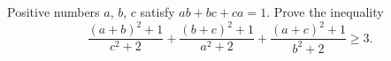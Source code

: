 \problem
Positive numbers $a$, $b$, $c$ satisfy $a b + b c + c a = 1$.
Prove the inequality
\[
    \frac{(a + b)^2 + 1}{c^2 + 2}
    +
    \frac{(b + c)^2 + 1}{a^2 + 2}
    +
    \frac{(a + c)^2 + 1}{b^2 + 2}
\geq
    3
.\]

\solution

\endproblem
